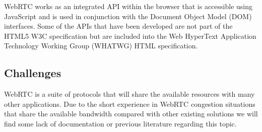 %



WebRTC works as an integrated API within the browser that is accessible using JavaScript and is used in conjunction with the Document Object Model (DOM) interfaces. Some of the APIs that have been developed are not part of the HTML5 W3C specification but are included into the Web HyperText Application Technology Working Group (WHATWG)  HTML specification.

\subsection{Challenges}

WebRTC is a suite of protocols that will share the available resources with many other applications. Due to the short experience in WebRTC congestion situations that share the available bandwidth compared with other existing solutions we will find some lack of documentation or previous literature regarding this topic. 

